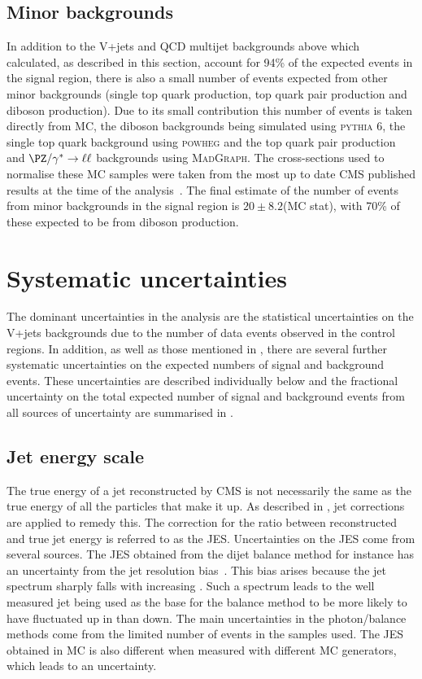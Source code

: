\subsection{Minor backgrounds}
\label{sec:promptminor}
In addition to the V+jets and QCD multijet backgrounds above which calculated, as described in this section, account for 94\% of the expected events in the signal region, there is also a small number of events expected from other minor backgrounds (single top quark production, top quark pair production and diboson production). Due to its small contribution this number of events is taken directly from \ac{MC}, the diboson backgrounds being simulated using \textsc{pythia 6}, the single top quark background using \textsc{powheg} and the top quark pair production and $\PZ/\gamma^{*}\rightarrow\ell\ell$ backgrounds using \textsc{MadGraph}. The cross-sections used to normalise these \ac{MC} samples were taken from the most up to date CMS published results at the time of the analysis~\cite{CMS:2012fza,CMS:2012iza,CMS:2012zva,CMS:2013qea,CMS:2013hea}. The final estimate of the number of events from minor backgrounds in the signal region is $20\pm 8.2$(MC stat), with 70\% of these expected to be from diboson production.


\section{Systematic uncertainties}
\label{sec:promptsyst}
The dominant uncertainties in the analysis are the statistical uncertainties on the V+jets backgrounds due to the number of data events observed in the control regions. In addition, as well as those mentioned in , there are several further systematic uncertainties on the expected numbers of signal and background events. These uncertainties are described individually below and the fractional uncertainty on the total expected number of signal and background events from all sources of uncertainty are summarised in .
\subsection{Jet energy scale}
\label{sec:promptjes}
The true energy of a jet reconstructed by CMS is not necessarily the same as the true energy of all the particles that make it up. As described in , jet corrections are applied to remedy this. The correction for the ratio between reconstructed and true jet energy is referred to as the \ac{JES}. Uncertainties on the \ac{JES} come from several sources. The \ac{JES} obtained from the dijet \pt balance method for instance has an uncertainty from the jet resolution bias~\cite{CMS-JME-10-011}. This bias arises because the jet \pt spectrum sharply falls with increasing \pt. Such a spectrum leads to the well measured jet being used as the base for the balance method to be more likely to have fluctuated up in \pt than down. The main uncertainties in the photon/\PZ balance methods come from the limited number of events in the samples used. The \ac{JES} obtained in \ac{MC} is also different when measured with different \ac{MC} generators, which leads to an uncertainty.


